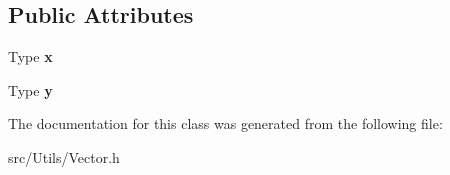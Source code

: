 \subsection*{Public Attributes}
\begin{DoxyCompactItemize}
\item 
\mbox{\label{class_dolly_1_1_utils_1_1_vector2_aeb691136395de1d7e5ed31433a3aae06}} 
Type {\bfseries x}
\item 
\mbox{\label{class_dolly_1_1_utils_1_1_vector2_a63d06c126ecf4f2733763a4f800b4c23}} 
Type {\bfseries y}
\end{DoxyCompactItemize}


The documentation for this class was generated from the following file\+:\begin{DoxyCompactItemize}
\item 
src/\+Utils/Vector.\+h\end{DoxyCompactItemize}
